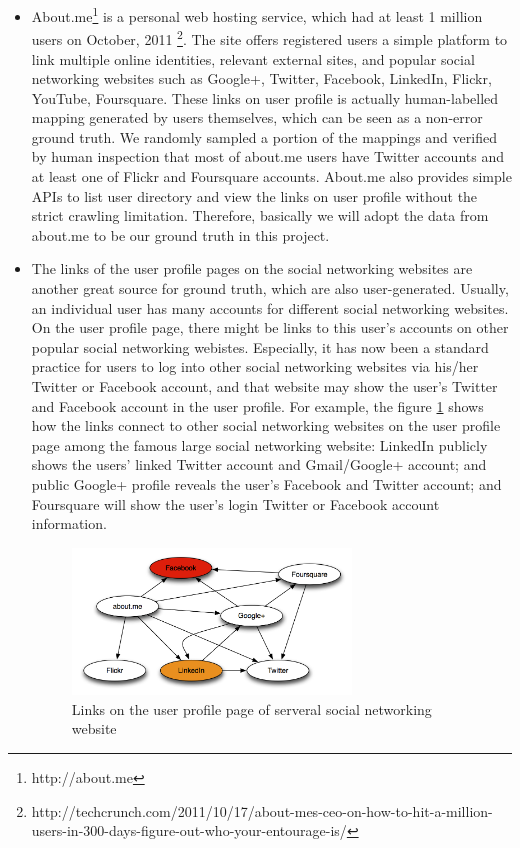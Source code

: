 \documentclass[11pt,letterpaper]{article}
\begin{document}
\begin{itemize}
\item
About.me\footnote{http://about.me} is a personal web hosting service, which had at least 1 million users on October, 2011 \footnote{http://techcrunch.com/2011/10/17/about-mes-ceo-on-how-to-hit-a-million-users-in-300-days-figure-out-who-your-entourage-is/}. The site offers registered users a simple platform to link multiple online identities, relevant external sites, and popular social networking websites such as Google+, Twitter, Facebook, LinkedIn, Flickr, YouTube, Foursquare. These links on user profile is actually human-labelled mapping generated by users themselves, which can be seen as a non-error ground truth.  We randomly sampled a portion of the mappings and verified by human inspection that most of about.me users have Twitter accounts and at least one of Flickr and Foursquare accounts. About.me also provides simple APIs to list user directory and view the links on user profile without the strict crawling limitation. Therefore, basically we will adopt the data from about.me to be our ground truth in this project.
\item
The links of the user profile pages on the social networking websites are another great source for ground truth, which are also user-generated. Usually, an individual user has many accounts for different social networking websites. On the user profile page, there might be links to this user's accounts on other popular social networking webistes. Especially, it has now been a standard practice for users to log into other social networking websites via his/her Twitter or Facebook account, and that website may show the user's Twitter and Facebook account in the user profile. For example, the figure \ref{fig:infer} shows how the links connect to other social networking websites on the user profile page among the famous large social networking website: LinkedIn publicly shows the users' linked Twitter account and Gmail/Google+ account; and public Google+ profile reveals the user's Facebook and Twitter account; and Foursquare will show the user's login Twitter or Facebook account information. 

\begin{figure}[h!]
\centering
\caption{Links on the user profile page of serveral social networking website}
\label{fig:infer}
\includegraphics[width=0.7\textwidth]{fig/infer.jpg}
\end{figure}


\end{itemize}
\end{document}
